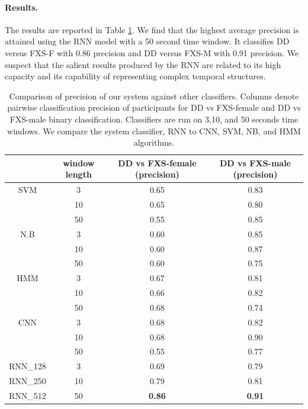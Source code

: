 \documentclass{llncs}
\begin{document}
\paragraph{Results.} The results are reported in Table  \ref{table:profiler}. We find that the highest average precision is attained using the {\color{red} RNN} model with a 50 second time window. It classifies DD versus FXS-F with 0.86 precision and DD versus FXS-M with 0.91 precision. We suspect that the salient results produced by the RNN are related to its high capacity and its capability of representing complex temporal structures.
  
\begin{table}[t]
    \centering
    \begin{tabular}{c|c|c|c}
      & window length & DD vs FXS-female (precision) & DD vs FXS-male (precision)\\
      \hline
      SVM  & 3   & 0.65 & 0.83\\
      & 10 & 0.65 & 0.80 \\
      & 50 & 0.55 & 0.85 \\

      \hline
      N.B   & 3  & 0.60 & 0.85\\
      & 10 & 0.60 & 0.87\\
      & 50 & 0.60 & 0.75\\

      \hline
      HMM & 3  & 0.67 & 0.81\\
      & 10 & 0.66 & 0.82\\
      & 50 & 0.68 & 0.74\\

      \hline
      CNN & 3 & 0.68 & 0.82 \\
      & 10 & 0.68 & 0.90\\
      & 50 & 0.55 & 0.77\\
      \hline
      RNN\_128  & 3 &  0.69 & 0.79 \\
      RNN\_250 & 10 &   0.79 &  0.81\\
      RNN\_512 &  50 & {\bf 0.86} & {\bf 0.91}\\

    \end{tabular}
    \caption{Comparison of precision of our system against other classifiers. Columns denote pairwise classification precision of participants for DD vs FXS-female and DD vs FXS-male binary classification. Classifiers are run on 3,10, and 50 seconds time windows. We compare the system classifier, RNN to CNN, SVM, NB, and HMM algorithms.}
    \label{table:profiler}
  \end{table}
  
\end{document}
